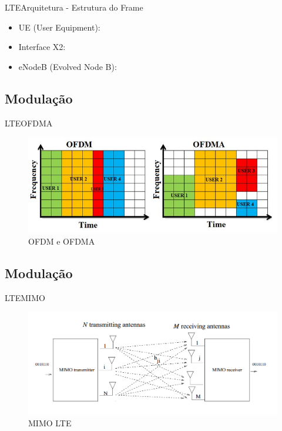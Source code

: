 \documentclass[10pt,aspectratio=169]{beamer} %
\begin{document}
\begin{frame}{LTE}{Arquitetura - Estrutura do Frame}
    \begin{itemize}
        \item UE (User Equipment):
        \item Interface X2: %
        \item eNodeB (Evolved Node B):
    \end{itemize}
\end{frame}
\subsection{Modulação}
\begin{frame}{LTE}{OFDMA}
\begin{figure}[!htb]
    \centering
    \includegraphics[scale=0.6]{LRCgraphics/difference-between-ofdm-and-ofdma.jpg}
    \caption{OFDM e OFDMA}
\end{figure}
\end{frame}
\subsection{Modulação}
\begin{frame}{LTE}{MIMO}
\begin{figure}[!htb]
    \centering
    \includegraphics[scale=0.5]{LRCgraphics/mimo.png}
    \caption{MIMO LTE \cite{mimogta2014}}
\end{figure}
\end{frame}
\end{document}
